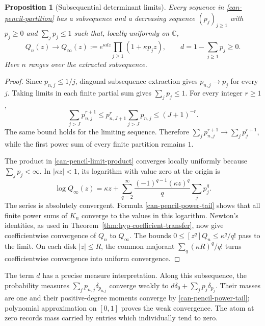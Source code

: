 \documentclass[11pt,a4paper]{article}
\numberwithin{equation}{section}
\newtheorem{proposition}[theorem]{Proposition}
\theoremstyle{definition}
\theoremstyle{remark}
\newcommand{\C}{\mathbb C}
\begin{document}
\begin{proposition}[Subsequential determinant limits]\label{can-pencil-limit}
Every sequence in \eqref{can-pencil-partition} has a subsequence and a
decreasing sequence $(p_j)_{j\geq1}$ with $p_j\geq0$ and
$\sum_jp_j\leq1$ such that, locally uniformly on $\C$,
\begin{equation}\label{can-pencil-limit-product}
Q_n(z)\longrightarrow
Q_\infty(z):=e^{\kappa d z}\prod_{j\geq1}(1+\kappa p_jz),
\qquad d=1-\sum_{j\geq1}p_j\geq0.
\end{equation}
Here $n$ ranges over the extracted subsequence.
\end{proposition}
\begin{proof}
Since $p_{n,j}\leq1/j$, diagonal subsequence extraction gives
$p_{n,j}\to p_j$ for every $j$. Taking limits in each finite partial
sum gives $\sum_jp_j\leq1$. For every integer $r\geq1$,
\begin{equation}\label{can-pencil-power-tail}
\sum_{j>J}p_{n,j}^{r+1}
\leq p_{n,J+1}^{r}\sum_{j>J}p_{n,j}
\leq(J+1)^{-r}.
\end{equation}
The same bound holds for the limiting sequence. Therefore
$\sum_jp_{n,j}^{r+1}\to\sum_jp_j^{r+1}$, while the first power sum
of every finite partition remains $1$.

The product in \eqref{can-pencil-limit-product} converges locally
uniformly because $\sum_jp_j<\infty$. In $|\kappa z|<1$, its
logarithm with value zero at the origin is
\[
\log Q_\infty(z)=\kappa z+
\sum_{q=2}^{\infty}\frac{(-1)^{q-1}(\kappa z)^q}{q}
\sum_jp_j^q.
\]
The series is absolutely convergent. Formula
\eqref{can-pencil-power-tail} shows that all finite power sums of
$K_n$ converge to the values in this logarithm. Newton's identities,
as used in Theorem~\ref{thm:hyp-coefficient-transfer}, now give
coefficientwise convergence of $Q_n$ to $Q_\infty$. The bounds
$0\leq[z^q]Q_n\leq\kappa^q/q!$ pass to the limit. On each disk
$|z|\leq R$, the common majorant $\sum_q(\kappa R)^q/q!$ turns
coefficientwise convergence into uniform convergence.
\end{proof}

The term $d$ has a precise measure interpretation. Along this subsequence,
the probability measures $\sum_jp_{n,j}\delta_{p_{n,j}}$ converge weakly to
$d\delta_0+\sum_jp_j\delta_{p_j}$. Their masses are one and their
positive-degree moments converge by \eqref{can-pencil-power-tail};
polynomial approximation on $[0,1]$ proves the weak convergence.
The atom at zero records mass carried by entries which individually
tend to zero.
\end{document}
